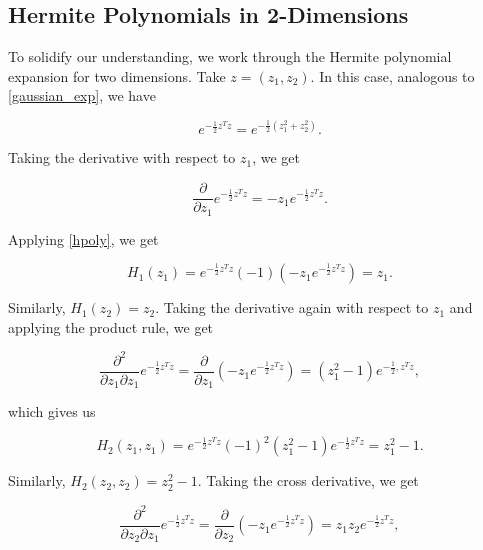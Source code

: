 \documentclass[11pt]{article}
\numberwithin{equation}{section}
\begin{document}
\begin{appendix}

\section{Hermite Polynomials in 2-Dimensions} \label{app:hermite2d}

To solidify our understanding, we work through the Hermite polynomial expansion for two dimensions. Take $z = (z_1, z_2)$. In this case, analogous to \eqref{gaussian_exp}, we have

\begin{equation}
e^{-\frac{1}{2} z^T z} = e^{-\frac{1}{2} (z_1^2 + z_2^2)}.
\end{equation}

Taking the derivative with respect to $z_1$, we get

\begin{equation*}
\frac{\partial}{\partial z_1} e^{-\frac{1}{2} z^T z} = -z_1 e^{-\frac{1}{2} z^T z}.
\end{equation*}

Applying \eqref{hpoly}, we get

\begin{equation}
H_1(z_1) = e^{-\frac{1}{2} z^T z} (-1) \left( -z_1 e^{-\frac{1}{2} z^T z} \right) = z_1.
\end{equation}

Similarly, $H_1(z_2) = z_2$. Taking the derivative again with respect to $z_1$ and applying the product rule, we get

\begin{equation*}
\frac{\partial^2}{\partial z_1 \partial z_1} e^{-\frac{1}{2} z^T z} = \frac{\partial}{\partial z_1} \left( -z_1 e^{-\frac{1}{2} z^T z} \right) = \left( z_1^2 - 1 \right) e^{-\frac{1}{2}, z^T z},
\end{equation*}

which gives us

\begin{equation}
H_2(z_1, z_1) = e^{-\frac{1}{2} z^T z} (-1)^2 (z_1^2 -1) e^{-\frac{1}{2} z^T z} = z_1^2 -1.
\end{equation}

Similarly, $H_2(z_2, z_2) = z_2^2 -1$. Taking the cross derivative, we get

\begin{equation*}
\frac{\partial^2}{\partial z_2 \partial z_1} e^{-\frac{1}{2} z^T z} = \frac{\partial}{\partial z_2} \left( -z_1 e^{-\frac{1}{2} z^T z} \right) =  z_1 z_2  e^{-\frac{1}{2} z^T z},
\end{equation*}


\end{appendix}
\end{document}
